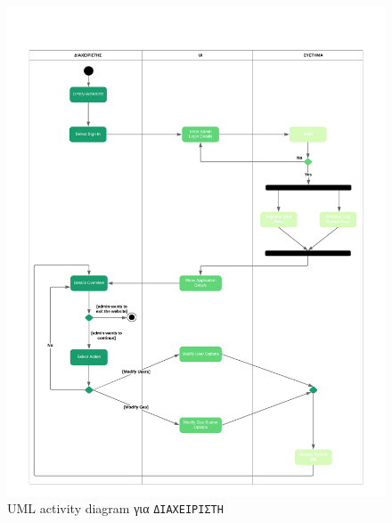 \begin{figure}
	\centering\includegraphics[width = \linewidth]{uml/admin.png}
	\caption{UML activity diagram για \texttt{ΔΙΑΧΕΙΡΙΣΤΗ}}
\end{figure}